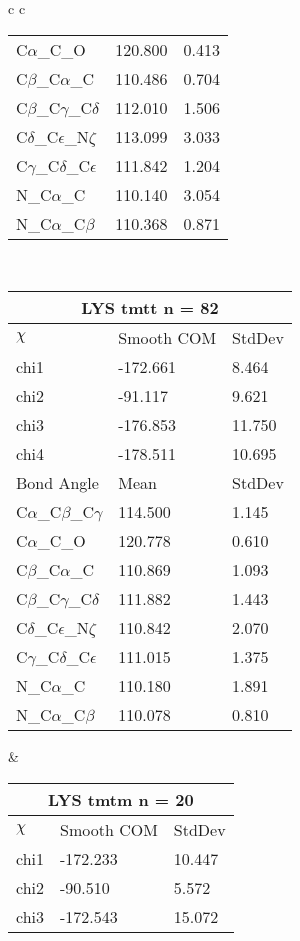 \begin{longtable}{ c c }
\begin{tabular}{ l l l }
  C$\alpha$\_C\_O & 120.800 & 0.413\\
  C$\beta$\_C$\alpha$\_C & 110.486 & 0.704\\
  C$\beta$\_C$\gamma$\_C$\delta$ & 112.010 & 1.506\\
  C$\delta$\_C$\epsilon$\_N$\zeta$ & 113.099 & 3.033\\
  C$\gamma$\_C$\delta$\_C$\epsilon$ & 111.842 & 1.204\\
  N\_C$\alpha$\_C & 110.140 & 3.054\\
  N\_C$\alpha$\_C$\beta$ & 110.368 & 0.871\\
  \bottomrule
  \end{tabular}
  \\
  \begin{tabular}{ l l l }
  \toprule
  \multicolumn{3}{c}{LYS \textbf{tmtt} n = 82} \\ \toprule
  $\chi$       & Smooth COM & StdDev \\ \midrule
  chi1 & -172.661 & 8.464 \\ 
  chi2 & -91.117 & 9.621 \\ 
  chi3 & -176.853 & 11.750 \\ 
  chi4 & -178.511 & 10.695 \\ \midrule
  Bond Angle   & Mean     & StdDev \\ \midrule
  C$\alpha$\_C$\beta$\_C$\gamma$ & 114.500 & 1.145\\
  C$\alpha$\_C\_O & 120.778 & 0.610\\
  C$\beta$\_C$\alpha$\_C & 110.869 & 1.093\\
  C$\beta$\_C$\gamma$\_C$\delta$ & 111.882 & 1.443\\
  C$\delta$\_C$\epsilon$\_N$\zeta$ & 110.842 & 2.070\\
  C$\gamma$\_C$\delta$\_C$\epsilon$ & 111.015 & 1.375\\
  N\_C$\alpha$\_C & 110.180 & 1.891\\
  N\_C$\alpha$\_C$\beta$ & 110.078 & 0.810\\
  \bottomrule
  \end{tabular}
  &
  \begin{tabular}{ l l l }
  \toprule
  \multicolumn{3}{c}{LYS \textbf{tmtm} n = 20} \\ \toprule
  $\chi$       & Smooth COM & StdDev \\ \midrule
  chi1 & -172.233 & 10.447 \\ 
  chi2 & -90.510 & 5.572 \\ 
  chi3 & -172.543 & 15.072 \\ 

\end{tabular}
\end{longtable}
